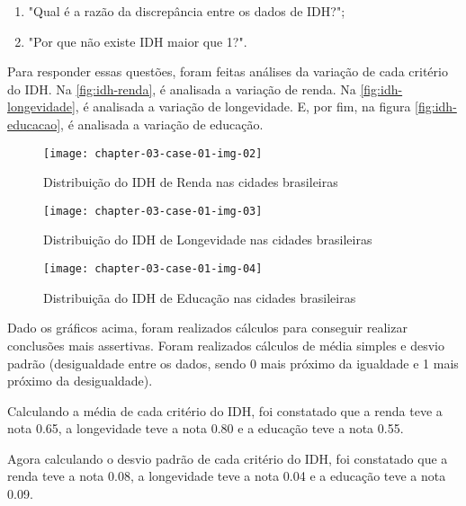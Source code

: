 \begin{enumerate}
	\item "Qual é a razão da discrepância entre os dados de IDH?";
	\item "Por que não existe IDH maior que 1?".
\end{enumerate}

Para responder essas questões, foram feitas análises da variação de cada critério do IDH. Na \autoref{fig:idh-renda}, é analisada a variação de renda. Na \autoref{fig:idh-longevidade}, é analisada a variação de longevidade. E, por fim, na figura \autoref{fig:idh-educacao}, é analisada a variação de educação.

\begin{figure}[H]
  \centering
  \caption{\label{fig:idh-renda}Distribuição do IDH de Renda nas cidades brasileiras}
  \label{fig:der}
  \texttt{[image: chapter-03-case-01-img-02]}
\end{figure}

\begin{figure}[H]
  \centering
  \caption{\label{fig:idh-longevidade}Distribuição do IDH de Longevidade nas cidades brasileiras}
  \label{fig:der}
  \texttt{[image: chapter-03-case-01-img-03]}
\end{figure}

\begin{figure}[H]
  \centering
  \caption{\label{fig:idh-educacao}Distribuiçãa do IDH de Educação nas cidades brasileiras}
  \label{fig:der}
  \texttt{[image: chapter-03-case-01-img-04]}
\end{figure}

Dado os gráficos acima, foram realizados cálculos para conseguir realizar conclusões mais assertivas. Foram realizados cálculos de média simples e desvio padrão (desigualdade entre os dados, sendo 0 mais próximo da igualdade e 1 mais próximo da desigualdade).

Calculando a média de cada critério do IDH, foi constatado que a renda teve a nota 0.65, a longevidade teve a nota 0.80 e a educação teve a nota 0.55.

Agora calculando o desvio padrão de cada critério do IDH, foi constatado que a renda teve a nota 0.08, a longevidade teve a nota 0.04 e a educação teve a nota 0.09.

